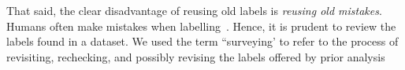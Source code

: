\documentclass[10pt,conference]{IEEEtran}
\begin{document}
That said, the clear disadvantage of reusing old labels is {\em reusing old mistakes}.
Humans often make mistakes when  labelling~\cite{hatton2008testing}.  Hence,
it is prudent 
to  
  review   the labels found in a dataset. We used the term ``surveying' to refer to the process of 
revisiting,  rechecking, and possibly revising
the labels offered by prior analysis
  
  

\end{document}
